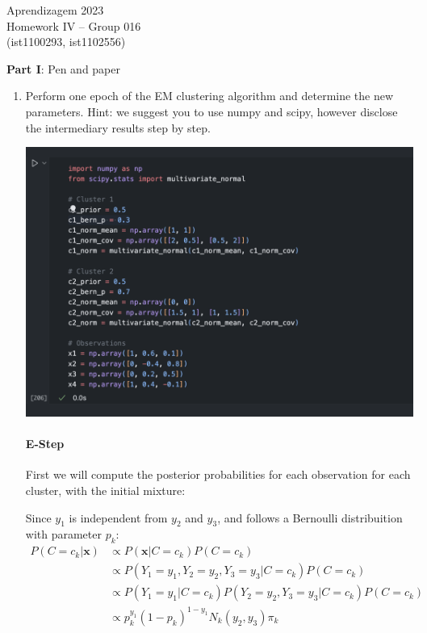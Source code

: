 \documentclass[12pt]{article}
\begin{document}
\newcommand{\prob}{\textrm{P}}
\newcommand{\ind}{\perp\!\!\!\!\!\perp} 
\newcommand{\notind}{\not\perp\!\!\!\!\!\perp}
\newcommand{\defeq}{\vcentcolon=}

\center
Aprendizagem 2023\\
Homework IV -- Group 016\\
(ist1100293, ist1102556)\vskip 1cm

\large{\textbf{Part I}: Pen and paper}\normalsize

\begin{enumerate}[leftmargin=\labelsep]
    \item Perform one epoch of the EM clustering algorithm and determine the new parameters.
    Hint: we suggest you to use numpy and scipy, however disclose the intermediary results step by step.

    \begin{center}
        \includegraphics[scale=0.5]{images/code1.png}
    \end{center}

    \paragraph{E-Step} First we will compute the posterior probabilities for each observation for each cluster, with the initial mixture:

    Since $y_1$ is independent from $y_2$ and $y_3$, and follows a Bernoulli distribuition with parameter $p_k$:
    \begin{equation}
    \begin{aligned}
        P(C=c_k|\mathbf{x}) &\propto P(\mathbf{x}|C=c_k)P(C=c_k) \\
        &\propto P(Y_1 = y_1, Y_2 = y_2, Y_3= y_3|C=c_k)P(C=c_k) \\
        &\propto P(Y_1 = y_1|C=c_k)P(Y_2 = y_2, Y_3=y_3|C=c_k)P(C=c_k) \\
        &\propto p_k^{y_1}(1-p_k)^{1-y_1}N_k(y_2, y_3)\pi_k
    \end{aligned}
    \end{equation}


\end{enumerate}
\end{document}

